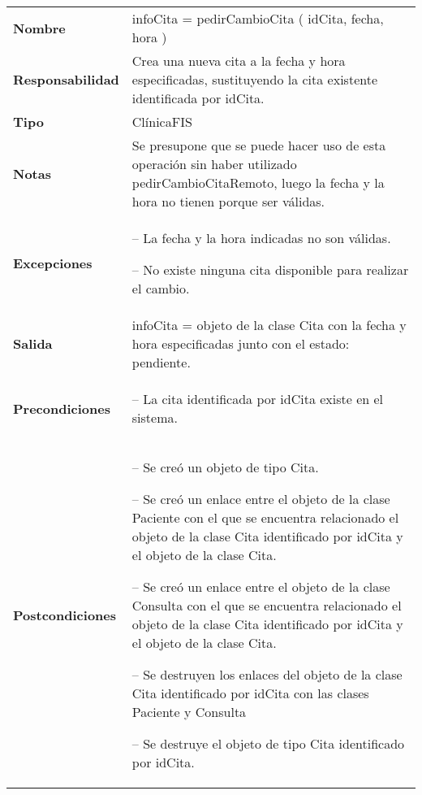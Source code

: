  \begin{table}[H]
  \centering
  \begin{tabularx}{\textwidth}{l|X}
    \textbf{Nombre}        &  infoCita = pedirCambioCita ( idCita, fecha, hora ) \\ 
    \textbf{Responsabilidad}  &  Crea una nueva cita a la fecha y hora
    especificadas, sustituyendo la cita existente identificada por idCita. \\ 
    \textbf{Tipo}        &  ClínicaFIS \\ 
    \textbf{Notas}        &  Se presupone que se puede hacer uso de esta
    operación sin haber utilizado pedirCambioCitaRemoto, luego la fecha y la
    hora no tienen porque ser válidas.\\
    \textbf{Excepciones}    &
    \begin{itemizenomargins}
    \item[--] La fecha y la hora indicadas no son válidas.
    \item[--] No existe ninguna cita disponible para realizar el cambio.
    \end{itemizenomargins} \\
    \textbf{Salida}        &  infoCita = objeto de la clase Cita con la fecha y
    hora especificadas junto con el estado: pendiente.\\ 
    \textbf{Precondiciones}    &
    \begin{itemizenomargins}
    \item[--] La cita identificada por idCita existe en el sistema.
    \end{itemizenomargins} \\ 
    \textbf{Postcondiciones}  &
    \begin{itemizenomargins}
    \item[--] Se creó un objeto de tipo Cita.
    \item[--] Se creó un enlace entre el objeto de la clase Paciente con el que
      se encuentra relacionado el objeto de la clase Cita identificado por idCita y el objeto de la clase Cita.
    \item[--] Se creó un enlace entre el objeto de la clase Consulta con el que
      se encuentra relacionado el objeto de la clase Cita identificado por idCita y el objeto de la clase Cita.
    \item[--] Se destruyen los enlaces del objeto de la clase Cita identificado
      por idCita con las clases Paciente y Consulta
    \item[--] Se destruye el objeto de tipo Cita identificado por idCita.
      
    \end{itemizenomargins}

  \end{tabularx}
\end{table}

